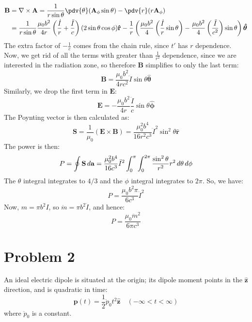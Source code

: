 \documentclass[10pt]{article}
\begin{document}
\begin{solution}
\begin{align*}
				\mathbf{B} &= \nabla \times \mathbf{A} = 
				\frac{1}{r\sin \theta} \pdv{\theta}
				(\mathbf{A}_{\phi} \sin \theta) - \pdv{r} (r \mathbf{A}_{\phi})\\  
				&= \frac{1}{r\sin \theta} \frac{\mu_0b^2}{4r} 
				\left( \frac{\dot I}{r} + \frac{\ddot I}{c} \right)(2 \sin \theta \cos
				\phi) \mathbf{\hat{r}} - \frac{1}{r}\left( \frac{\mu_0b^2}{4}\left( \frac{\dot I}{r}\sin
				\theta \right) - \frac{\mu_0b^2}{4}\left( \frac{\ddot I}{c^2} \right)\sin \theta
			\right)\boldsymbol{\hat{\theta}}
		\end{align*}
		The extra factor of \( -\frac{1}{c} \) comes from the chain rule, since \( t' \) has \( r \)
		dependence. Now, we get rid of all the terms with greater than \( \frac{1}{r^2} \) dependence, since
		we are interested in the radiation zone, so therefore \( \mathbf{B} \) simplifies to only the last
		term:
		\[
			\mathbf{B} = \frac{\mu_0b^2}{4rc^2} \ddot I \sin \theta \boldsymbol{\hat{\theta}}
		\]
		Similarly, we drop the first term in \( \mathbf{E} \):
		\[
			\mathbf{E} = -\frac{\mu_0b^2}{4r} \frac{\ddot I}{c} \sin \theta \boldsymbol{\hat{\phi}}
		\]
		The Poynting vector is then calculated as:
		\[
			\mathbf{S} = \frac{1}{\mu_0}(\mathbf{E} \times \mathbf{B}) = \frac{\mu_0^2 b^{4}}{16r^2 c^3}
			\ddot I^2 \sin^2 \theta \mathbf{\hat{r}}
		\]
		The power is then:
		\[
			P = \oint \mathbf{S} \,d \mathbf{a} = \frac{\mu_0^2 b^{4}}{16c^3} \ddot I^2
			\int_{0}^{\pi}\int_{0}^{2\pi} \frac{\sin^2 \theta}{r^2} r^2 \,d \theta \,d \phi
		\]
		The \( \theta \) integral integrates to \( 4 / 3 \)
	and the \( \phi \) integral integrates to \( 2\pi \). So, we have:
	\[
		P = \frac{\mu_0b^2\pi}{6c^3}\ddot I^2
	\]
	Now, \( m = \pi b^2 I \), so \( \ddot m = \pi b^2 \ddot I \), and hence:
	\[
		P = \frac{\mu_0\ddot m^2}{6\pi c^3}
	\]
	\end{solution}
	\pagebreak
	\section*{Problem 2}
	An ideal electric dipole is situated at the origin; its dipole moment points in the \( \mathbf{\hat{z}}
	\) direction, and is quadratic in time:
	\[
		\mathbf{p}(t) = \frac{1}{2}\ddot p_0 t^2 \mathbf{\hat{z}} \quad (-\infty < t < \infty)
	\]
	where \( \ddot p_0 \) is a constant. 
\end{document}
